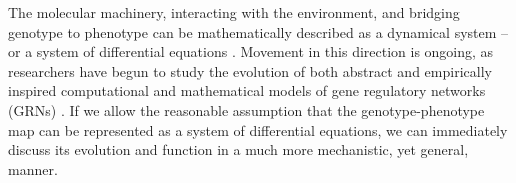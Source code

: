 \documentclass{article}
\newcommand{\1}{\mathbbm{1}}
\begin{document}

The molecular machinery, interacting with the environment, and bridging genotype to phenotype
can be mathematically described as a dynamical system -- or a system of differential equations \citep{jaeger2015comet}.
 Movement in this direction is ongoing, as researchers have begun to study 
the evolution of both abstract \citep{wagner1994evolution, wagner1996does,  siegal2002waddington, bergman2003evolutionary, draghi2015robustness} and empirically inspired computational and mathematical models of gene regulatory networks (GRNs) \citep{mjolsness1991connectionist, jaeger2004dynamic, maria1, vitaly1, vitaly2, crombach2016gap, wotton2015quantitative, chertkova2017insilico}. If we allow the reasonable assumption that the genotype-phenotype map can be represented as a system of differential equations, we can immediately discuss its evolution and function in a much more mechanistic, yet general, manner. 
\end{document}

